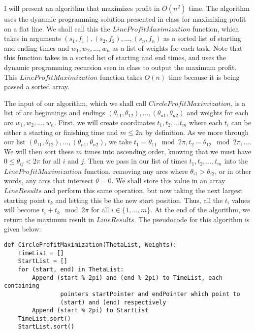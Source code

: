 \documentclass[psamsfonts]{amsart}
\newenvironment{sol}{{\bfseries Solution}}{\qedsymbol}
\theoremstyle{definition}
\theoremstyle{remark}
\numberwithin{equation}{section}
\begin{document}
\begin{sol}
I will present an algorithm that maximizes profit in $O(n^2)$ time. The algorithm uses the dynamic programming solution presented in class for maximizing profit on a flat line. We shall call this the $LineProfitMaximization$ function, which takes in arguments $(s_1, f_1), (s_2, f_2), \ldots, (s_n, f_n)$ as a sorted list of starting and ending times and $w_1, w_2, \ldots, w_n$ as a list of weights for each task. Note that this function takes in a sorted list of starting and end times, and uses the dynamic programming recursion seen in class to output the maximum profit. This $LineProfitMaximization$ function takes $O(n)$ time because it is being passed a sorted array.

The input of our algorithm, which we shall call $CircleProfitMaximization$, is a list of arc beginnings and endings $(\theta_{11}, \theta_{12}), \ldots, (\theta_{n1}, \theta_{n2})$ and weights for each arc $w_1, w_2, \ldots, w_n$. First, we will create coordinates $t_1, t_2, \ldots t_m$ where each $t_i$ can be either a starting or finishing time and $m \leq 2n$ by definition. As we more through our list $(\theta_{11}, \theta_{12}), \ldots, (\theta_{n1}, \theta_{n2})$, we take $t_1 = \theta_{11} \mod 2 \pi, t_2 = \theta_{12} \mod 2 \pi, \ldots$.  We will then sort these $m$ times into ascending order, knowing that we must have $0 \leq \theta_{ij} < 2 \pi$ for all $i$ and $j$. Then we pass in our list of times $t_1, t_2, \ldots, t_m$ into the $LineProfitMaximization$ function, removing any arcs where $\theta_{i1} > \theta_{i2}$, or in other words, any arcs that intersect $\theta = 0$. We shall store this value in an array $LineResults$ and perform this same operation, but now taking the next largest starting point $t_k$ and letting this be the new start position. Thus, all the $t_i$ values will become $t_i + t_k \mod 2 \pi$ for all $i \in \{1, \ldots, m \}$. At the end of the algorithm, we return the maximum result in $LineResults$. The pseudocode for this algorithm is given below:

\begin{verbatim}
def CircleProfitMaximization(ThetaList, Weights):
    TimeList = []
    StartList = []
    for (start, end) in ThetaList:
        Append (start % 2pi) and (end % 2pi) to TimeList, each containing 
                pointers startPointer and endPointer which point to 
                (start) and (end) respectively
        Append (start % 2pi) to StartList
    TimeList.sort()
    StartList.sort()


\end{verbatim}
\end{sol}
\end{document}
